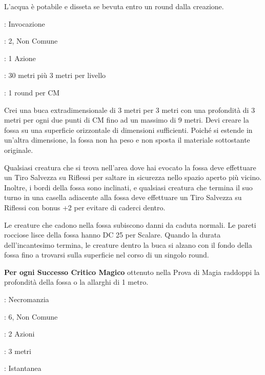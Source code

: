 \begin{multicols}{2}
L'acqua è potabile e disseta se bevuta entro un round dalla creazione.

\noindent\colorbox{OBSSgold!10}{
\begin{minipage}{0.95\linewidth}
\begin{description}[noitemsep, topsep=0pt, parsep=0pt, partopsep=0pt, leftmargin=0cm, labelwidth=1.3cm]
	\item[\textbf{Lista}]: Invocazione
	\item[\textbf{Livello}]: 2, Non Comune
	\item[\textbf{Lancio}]: 1 Azione
	\item[\textbf{Gittata}]: 30 metri più 3 metri per livello
	\item[\textbf{Durata}]: 1 round per CM
\end{description}
\end{minipage}}\smallskip

Crei una buca extradimensionale di 3 metri per 3 metri con una profondità di 3 metri per ogni due punti di CM fino ad un massimo di 9 metri. Devi creare la fossa su una superficie orizzontale di dimensioni sufficienti. Poiché si estende in un'altra dimensione, la fossa non ha peso e non sposta il materiale sottostante originale.

Qualsiasi creatura che si trova nell'area dove hai evocato la fossa deve effettuare un Tiro Salvezza su Riflessi per saltare in sicurezza nello spazio aperto più vicino. Inoltre, i bordi della fossa sono inclinati, e qualsiasi creatura che termina il suo turno in una casella adiacente alla fossa deve effettuare un Tiro Salvezza su Riflessi con bonus +2 per evitare di caderci dentro.

Le creature che cadono nella fossa subiscono danni da caduta normali. Le pareti rocciose lisce della fossa hanno DC 25 per Scalare. Quando la durata dell'incantesimo termina, le creature dentro la buca si alzano con il fondo della fossa fino a trovarsi sulla superficie nel corso di un singolo round.

\textbf{Per ogni Successo Critico Magico} ottenuto nella Prova di Magia raddoppi la profondità della fossa o la allarghi di 1 metro.

\noindent\colorbox{OBSSgold!10}{
\begin{minipage}{0.95\linewidth}
\begin{description}[noitemsep, topsep=0pt, parsep=0pt, partopsep=0pt, leftmargin=0cm, labelwidth=1.3cm]
	\item[\textbf{Lista}]: Necromanzia
	\item[\textbf{Livello}]: 6, Non Comune
	\item[\textbf{Lancio}]: 2 Azioni
	\item[\textbf{Gittata}]: 3 metri
	\item[\textbf{Durata}]: Istantanea
\end{description}
\end{minipage}}\smallskip


\end{multicols}
